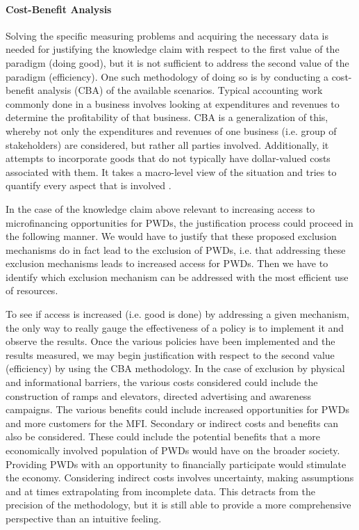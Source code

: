 \documentclass[a4paper]{article}
\begin{document}
\paragraph{Cost-Benefit Analysis} Solving the specific measuring problems and
acquiring the necessary data is needed for justifying the knowledge claim with
respect to the first value of the paradigm (doing good), but it is not
sufficient to address the second value of the paradigm (efficiency). One such
methodology of doing so is by conducting a cost-benefit analysis (CBA) of the
available scenarios. Typical accounting work commonly done in a business
involves looking at expenditures and revenues to determine the profitability
of that business. CBA is a generalization of this, whereby not only the
expenditures and revenues of one business (i.e. group of stakeholders) are
considered, but rather all parties involved. Additionally, it attempts to
incorporate goods that do not typically have dollar-valued costs associated
with them. It takes a macro-level view of the situation and tries to quantify
every aspect that is involved \cite{mishan2015elements}.

In the case of the knowledge claim above relevant to increasing access to
microfinancing opportunities for PWDs, the justification process could proceed
in the following manner. We would have to justify that these proposed
exclusion mechanisms do in fact lead to the exclusion of PWDs, i.e.  that
addressing these exclusion mechanisms leads to increased access for PWDs.
Then we have to identify which exclusion mechanism can be addressed
with the most efficient use of resources. 

To see if access is increased (i.e. good is done) by addressing a given
mechanism, the only way to really gauge the effectiveness of a policy is to
implement it and observe the results. Once the various policies have been
implemented and the results measured, we may begin justification with respect
to the second value (efficiency) by using the CBA methodology. In the case of
exclusion by physical and informational barriers, the various costs considered
could include the construction of ramps and elevators, directed advertising
and awareness campaigns. The various benefits could include increased
opportunities for PWDs and more customers for the MFI. Secondary or indirect
costs and benefits can also be considered. These could include the potential
benefits that a more economically involved population of PWDs would have on
the broader society. Providing PWDs with an opportunity to financially
participate would stimulate the economy. Considering indirect costs involves
uncertainty, making assumptions and at times extrapolating from incomplete
data. This detracts from the precision of the methodology, but it is still
able to provide a more comprehensive perspective than an intuitive feeling.
\end{document}
